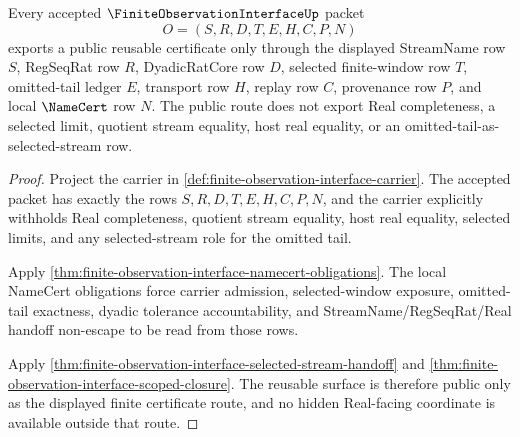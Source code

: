 \begin{theorem}
\label{thm:finite-observation-interface-public-certificate-route}
Every accepted $\FiniteObservationInterfaceUp$ packet
$$
O=(S,R,D,T,E,H,C,P,N)
$$
exports a public reusable certificate only through the displayed StreamName row $S$, RegSeqRat row $R$, DyadicRatCore row $D$, selected finite-window row $T$, omitted-tail ledger $E$, transport row $H$, replay row $C$, provenance row $P$, and local $\NameCert$ row $N$. The public route does not export Real completeness, a selected limit, quotient stream equality, host real equality, or an omitted-tail-as-selected-stream row.
\end{theorem}
\begin{proof}
Project the carrier in \autoref{def:finite-observation-interface-carrier}. The accepted packet has exactly the rows $S,R,D,T,E,H,C,P,N$, and the carrier explicitly withholds Real completeness, quotient stream equality, host real equality, selected limits, and any selected-stream role for the omitted tail.

Apply \autoref{thm:finite-observation-interface-namecert-obligations}. The local NameCert obligations force carrier admission, selected-window exposure, omitted-tail exactness, dyadic tolerance accountability, and StreamName/RegSeqRat/Real handoff non-escape to be read from those rows.

Apply \autoref{thm:finite-observation-interface-selected-stream-handoff} and \autoref{thm:finite-observation-interface-scoped-closure}. The reusable surface is therefore public only as the displayed finite certificate route, and no hidden Real-facing coordinate is available outside that route.
\end{proof}

